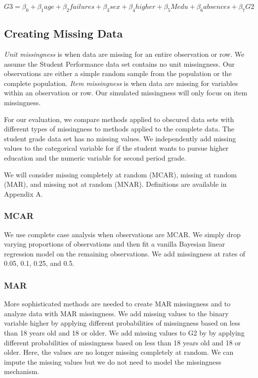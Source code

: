 \documentclass[11pt]{article}
\begin{document}
$$G3 = \beta_0 + \beta_1 age + \beta_2 failures + \beta_3 sex + \beta_4 higher + \beta_5 Medu + \beta_6 absences + \beta_7 G2$$

\subsection{Creating Missing Data}

\textit{Unit missingness} is when data are missing for an entire observation or row. We assume the Student Performance data set contains no unit missingness. Our observations are either a simple random sample from the population or the complete population. \textit{Item missingness} is when data are missing for variables within an observation or row. Our simulated missingness will only focus on item missingness.

For our evaluation, we compare methods applied to obscured data sets with different types of missingness to methods applied to the complete data. The student grade data set has no missing values. We independently add missing values to the categorical variable for if the student wants to pursue higher education and the numeric variable for second period grade. 

We will consider missing completely at random (MCAR), missing at random (MAR), and missing not at random (MNAR). Definitions are available in Appendix A. 

\subsubsection{MCAR}

We use complete case analysis when observations are MCAR. We simply drop varying proportions of observations and then fit a vanilla Bayesian linear regression model on the remaining observations. We add missingness at rates of 0.05, 0.1, 0.25, and 0.5.

\subsubsection{MAR}

More sophisticated methods are needed to create MAR missingness and to analyze data with MAR missingness. We add missing values to the binary variable higher by applying different probabilities of missingness based on less than 18 years old and 18 or older. We add missing values to G2 by by applying different probabilities of missingness based on less than 18 years old and 18 or older. Here, the values are no longer missing completely at random. We can impute the missing values but we do not need to model the missingness mechanism. 
\end{document}
